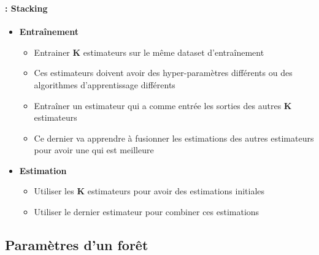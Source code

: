 \documentclass[xcolor=table]{beamer}
\begin{document}
\begin{frame}
	\frametitle{\insertsection}
	\framesubtitle{\insertsubsection: Stacking}
	
	\begin{itemize}
		\item \textbf{Entraînement}
		\begin{itemize}
			\item Entrainer \textbf{K} estimateurs sur le même dataset d'entraînement
			\item Ces estimateurs doivent avoir des hyper-paramètres différents ou des algorithmes d'apprentissage différents
			\item Entraîner un estimateur qui a comme entrée les sorties des autres \textbf{K} estimateurs 
			\item Ce dernier va apprendre à fusionner les estimations des autres estimateurs pour avoir une qui est meilleure
		\end{itemize}
		\item \textbf{Estimation}
		\begin{itemize}
			\item Utiliser les \textbf{K} estimateurs pour avoir des estimations initiales
			\item Utiliser le dernier estimateur pour combiner ces estimations
		\end{itemize}
	\end{itemize}
	
\end{frame}

\subsection{Paramètres d'un forêt}
\end{document}
